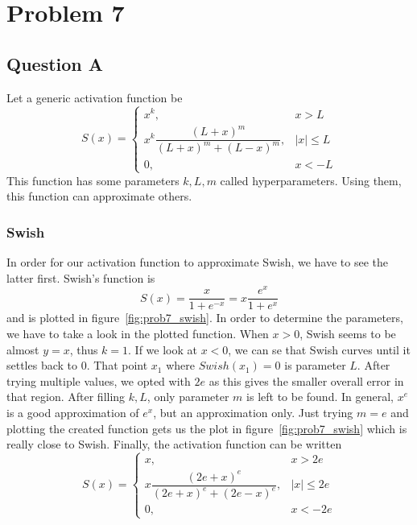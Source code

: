 \section{Problem 7}
\subsection{Question A}
Let a generic activation function be
\begin{equation}
S(x) = \left\{
\begin{array}{cc}
	x^k, & x>L\\[1mm]
	x^k \dfrac{\left(L+x\right)^m}{\left(L+x\right)^m + \left(L-x\right)^m}, & \left|x\right| \le L\\[1mm]
	0, & x < -L
\end{array}
\right.
\end{equation}
This function has some parameters $k,L,m$ called hyperparameters. Using them, this function can approximate others.

\subsubsection{Swish}
In order for our activation function to approximate Swish, we have to see the latter first.
Swish's function is 
\[
S(x) = \dfrac{x}{1+e^{-x}} = x\dfrac{e^x}{1+e^x}
\]
and is plotted in figure~\ref{fig:prob7_swish}. In order to determine the parameters, we have to take a look in the plotted function. When $x>0$, Swish seems to be almost $y=x$, thus $k=1$. If we look at $x<0$, we can se that Swish curves until it settles back to 0.
That point $x_1$ where $Swish (x_1) = 0$ is parameter $L$. After trying multiple values, we opted with $2e$ as this gives the smaller overall error in that region.
After filling $k,L$, only parameter $m$ is left to be found. In general, $x^e$ is a good approximation of $e^x$, but an approximation only. Just trying $m=e$ and plotting the created function gets us the plot in figure~\ref{fig:prob7_swish} which is really close to Swish.
Finally, the activation function can be written 
\[
S(x) = \left\{
\begin{array}{cc}
	x, & x>2e\\[1mm]
	x \dfrac{\left(2e+x\right)^e}{\left(2e+x\right)^e + \left(2e-x\right)^e}, & \left|x\right| \le 2e\\[1mm]
	0, & x < -2e
\end{array}
\right.
\]

